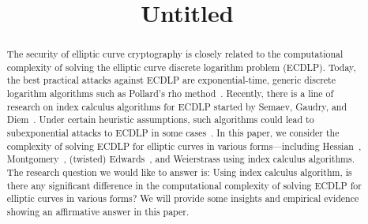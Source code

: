 \documentclass{llncs}
\begin{document}
%
\title{Untitled}
%
%
%
%

\maketitle              %

\begin{abstract}
%
  The security of elliptic curve cryptography is closely related to
  the computational complexity of solving the elliptic curve discrete
  logarithm problem (ECDLP).
%
  Today, the best practical attacks against ECDLP are
  exponential-time, generic discrete logarithm algorithms such as
  Pollard's rho method~\cite{1978-pollard-kangaroo}.
%
  Recently, there is a line of research on index calculus algorithms
  for ECDLP started by Semaev, Gaudry, and
  Diem~\cite{DBLP:journals/iacr/Semaev04,DBLP:journals/jsc/Gaudry09,DBLP:journals/moc/Diem11}.
%
  Under certain heuristic assumptions, such algorithms could lead to
  subexponential attacks to ECDLP in some
  cases~\cite{DBLP:conf/eurocrypt/FaugerePPR12,DBLP:journals/iacr/PetitQ12,DBLP:conf/iwsec/HuangPST13}.
%
  In this paper, we consider the complexity of solving ECDLP for
  elliptic curves in various forms---including
  Hessian~\cite{DBLP:conf/ches/Smart01},
  Montgomery~\cite{1987-montgomery}, (twisted)
  Edwards~\cite{DBLP:journals/iacr/BernsteinL07,DBLP:journals/iacr/BernsteinBJLP08},
  and Weierstrass using index calculus algorithms.
%
  The research question we would like to answer is: Using index
  calculus algorithm, is there any significant difference in the
  computational complexity of solving ECDLP for elliptic curves in
  various forms?
%
  We will provide some insights and empirical evidence showing an
  affirmative answer in this paper.
%
\end{abstract}









%
%


\end{document}
